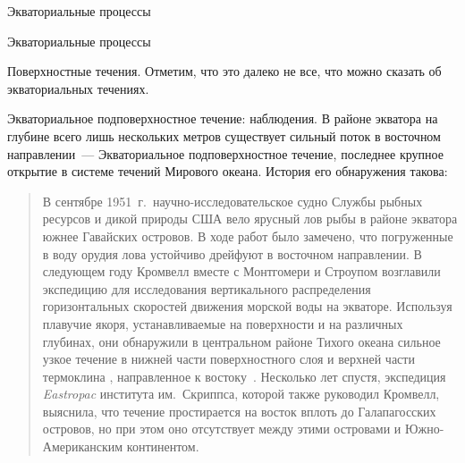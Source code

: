 \begin{chapter}{Экваториальные процессы}
\begin{section}{Экваториальные процессы}
\begin{paragraph}{Поверхностные течения.}
Отметим, что это далеко не все, что можно сказать об экваториальных течениях.
%
\end{paragraph}

\begin{paragraph}{Экваториальное подповерхностное течение: наблюдения.}
%
В районе экватора на глубине всего лишь нескольких метров существует
сильный поток в восточном направлении~--- Экваториальное
подповерхностное течение, последнее крупное открытие в системе течений 
Мирового океана. История его обнаружения такова:
%
\begin{quotation}
В сентябре 1951~г.\ научно-исследовательское судно Службы рыбных ресурсов 
и дикой природы США вело ярусный лов рыбы в районе экватора южнее Гавайских 
островов. В ходе работ было замечено, что погруженные в воду орудия лова 
устойчиво дрейфуют в восточном направлении. В следующем году Кромвелл вместе 
с Монтгомери и Строупом возглавили экспедицию для исследования вертикального 
распределения горизонтальных скоростей движения морской воды на экваторе. 
Используя плавучие якоря, устанавливаемые на поверхности и на различных 
глубинах, они обнаружили в центральном районе Тихого океана сильное узкое
течение в нижней части поверхностного слоя и верхней части термоклина
, 
направленное к востоку~\cite{Cromwell:1954}. Несколько лет спустя,
экспедиция \textit{Eastropac} института им.~Скриппса, которой также
руководил Кромвелл, выяснила, что течение простирается на восток вплоть 
до Галапагосских островов, но при этом оно отсутствует
между этими островами и Южно-Американским континентом.
%


\end{quotation}
\end{paragraph}
\end{section}
\end{chapter}

